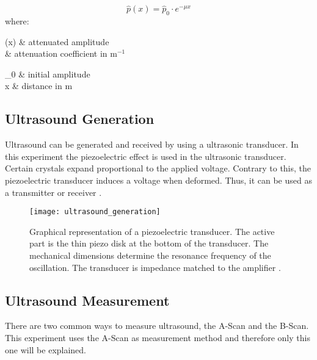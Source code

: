 \begin{equation}
\hat{p}(x) = \hat{p}_0 \cdot e^{-\mu x}
\label{eq:absorption}
\end{equation}
where:
\begin{multicols}{2}
\begin{conditions}
	(x) & attenuated amplitude \\
	\mu & attenuation coefficient in m$^{-1}$
\end{conditions}
\begin{conditions}
	_0 & initial amplitude \\
	x & distance in m
\end{conditions}
\end{multicols}

\subsection{Ultrasound Generation}
\label{subsec:Ultrasound_Generation}
Ultrasound can be generated and received by using a ultrasonic transducer. In this experiment the piezoelectric effect is used in the ultrasonic transducer. Certain crystals expand proportional to the applied voltage. Contrary to this, the piezoelectric transducer induces a voltage when deformed. Thus, it can be used as a transmitter or receiver \cite{ultrasound}.

\begin{figure}[H]
	\centering
	\texttt{[image: ultrasound\_generation]}
	\caption{Graphical representation of a piezoelectric transducer. The active part is the thin piezo disk at the bottom of the transducer. The mechanical dimensions determine the resonance frequency of the oscillation. The transducer is impedance matched to the amplifier \cite{ultrasound}.}
	\label{fig:ultrasound_generation}
\end{figure}

\newpage
\subsection{Ultrasound Measurement}
\label{subsec:Ultrasound_Measurement}
There are two common ways to measure ultrasound, the A-Scan and the B-Scan. This experiment uses the A-Scan as measurement method and therefore only this one will be explained.

